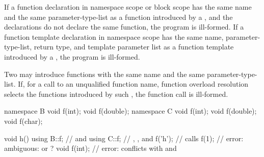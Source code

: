 \pnum
If a function declaration in namespace scope or block scope has the same
name and the same parameter-type-list as
a function introduced by a , and the
declarations do not declare the same function, the program is
ill-formed. If a function template declaration in namespace scope has
the same name, parameter-type-list, return type, and template
parameter list as a function template introduced by a
, the program is ill-formed.
\begin{note}
Two  may introduce functions with the same
name and the same parameter-type-list. If, for a call to an unqualified
function name, function overload resolution selects the functions
introduced by such , the function call is
ill-formed.
\begin{example}
\begin{codeblock}
namespace B {
  void f(int);
  void f(double);
}
namespace C {
  void f(int);
  void f(double);
  void f(char);
}

void h() {
  using B::f;       //  and 
  using C::f;       // , , and 
  f('h');           // calls 
  f(1);             // error: ambiguous:  or ?
  void f(int);      // error:  conflicts with  and 
}
\end{codeblock}
\end{example}
\end{note}

